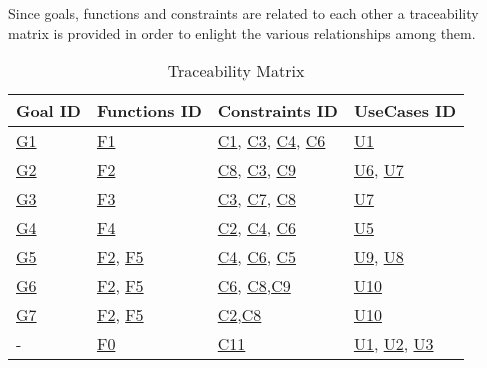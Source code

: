 Since goals, functions and constraints are related to each other a traceability matrix is provided in order to enlight the various relationships among them.
\begin{flushleft}

\begin{table}[htp]
\centering
\begin{tabular}{|l|l|l|l|}
\hline
Goal ID&Functions ID&Constraints ID&UseCases ID\\
\hline
\hyperlink{G1}{G1}&\hyperlink{sec:f1}{F1}&\hyperlink{C1}{C1}, \hyperlink{C3}{C3}, \hyperlink{C4}{C4}, \hyperlink{C6}{C6}&\hyperlink{tab:reportcreationtab}{U1}\\
\hline
\hyperlink{G2}{G2}&\hyperlink{sec:f2}{F2}&\hyperlink{C8}{C8}, \hyperlink{C3}{C3}, \hyperlink{C9}{C9}&\hyperlink{tab:dataminingtab}{U6}, \hyperlink{tab:dataminingofficertab}{U7}\\
\hline
\hyperlink{G3}{G3}&\hyperlink{sec:f3}{F3}&\hyperlink{C3}{C3}, \hyperlink{C7}{C7}, \hyperlink{C8}{C8}&\hyperlink{tab:dataminingofficertab}{U7}\\
\hline
\hyperlink{G4}{G4}&\hyperlink{sec:f4}{F4}&\hyperlink{C2}{C2}, \hyperlink{C4}{C4}, \hyperlink{C6}{C6}&\hyperlink{tab:AutomaticTrafficTicket}{U5}\\
\hline
\hyperlink{G5}{G5}&\hyperlink{sec:f2}{F2}, \hyperlink{sec:f5}{F5}&\hyperlink{C4}{C4}, \hyperlink{C6}{C6}, \hyperlink{C5}{C5}&\hyperlink{tab:dataminingvehicleofficerstab}{U9}, \hyperlink{tab:dataminingvehicletab}{U8}\\
\hline
\hyperlink{G6}{G6}&\hyperlink{sec:f2}{F2}, \hyperlink{sec:f5}{F5}&\hyperlink{C6}{C6},  \hyperlink{C8}{C8},\hyperlink{C9}{C9}&\hyperlink{tab:statisticsconsultingtab}{U10}\\
\hline
\hyperlink{G7}{G7}&\hyperlink{sec:f2}{F2}, \hyperlink{sec:f5}{F5}&  \hyperlink{C2}{C2},\hyperlink{C8}{C8}&\hyperlink{tab:statisticsconsultingtab}{U10}\\
\hline
-&\hyperlink{sec:f0}{F0}&\hyperlink{C11}{C11}&\hyperlink{tab:signupusecase}{U1}, \hyperlink{tab:loginusecase}{U2}, \hyperlink{tab:recoverpasswordusecase}{U3}\\
\hline
\end{tabular}

\caption{Traceability Matrix} 

\end{table}

\end{flushleft}
